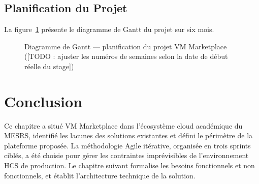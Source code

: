 \subsection{Planification du Projet}

La figure~\ref{fig:gantt} présente le diagramme de Gantt du projet sur six mois.

\begin{figure}[H]
\centering
{}
\caption{Diagramme de Gantt --- planification du projet VM Marketplace
([TODO : ajuster les numéros de semaines selon la date de début réelle du stage])}
\label{fig:gantt}
\end{figure}

\section{Conclusion}

Ce chapitre a situé VM Marketplace dans l'écosystème cloud académique du MESRS,
identifié les lacunes des solutions existantes et défini le périmètre de la plateforme
proposée. La méthodologie Agile itérative, organisée en trois sprints ciblés, a été
choisie pour gérer les contraintes imprévisibles de l'environnement HCS de production.
Le chapitre suivant formalise les besoins fonctionnels et non fonctionnels, et
établit l'architecture technique de la solution.

